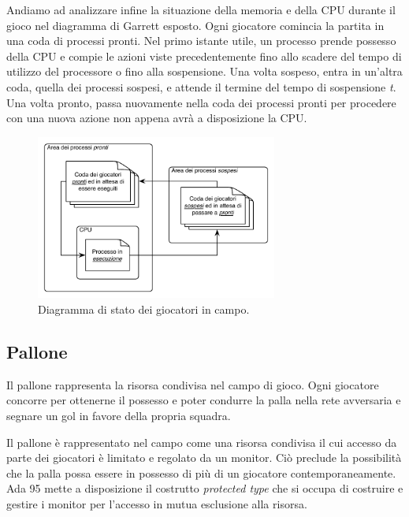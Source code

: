 \documentclass[aps,letterpaper,10pt]{article}
\begin{document}
Andiamo ad analizzare infine la situazione della memoria e della CPU durante il gioco nel diagramma di Garrett esposto.
Ogni giocatore comincia la partita in una coda di processi pronti. Nel primo istante utile, un processo prende possesso
della CPU e compie le azioni viste precedentemente fino allo scadere del tempo di utilizzo del processore o fino alla
sospensione. Una volta sospeso, entra in un'altra coda, quella dei processi sospesi, e attende il termine del tempo di
sospensione \emph{t}. Una volta pronto, passa nuovamente nella coda dei processi pronti per procedere con una nuova
azione non appena avr\`a a disposizione la CPU.

\begin{figure}[H]
	\begin{center}
		\includegraphics[width=300px]{images/player-schema.pdf}
	\end{center}
\caption{Diagramma di stato dei giocatori in campo.}
\end{figure}

\subsection{Pallone}
\label{pallone}

Il pallone rappresenta la risorsa condivisa nel campo di gioco. Ogni giocatore concorre per ottenerne il possesso e
poter condurre la palla nella rete avversaria e segnare un gol in favore della propria squadra. \vspace{3mm}

Il pallone \`e rappresentato nel campo come una risorsa condivisa il cui accesso da parte dei giocatori \`e limitato e
regolato da un monitor. Ci\`o preclude la possibilit\`a che la palla possa essere in possesso di pi\`u di un giocatore
contemporaneamente. Ada 95 mette a disposizione il costrutto \emph{protected type} che si occupa di costruire e gestire
i monitor per l'accesso in mutua esclusione alla risorsa. \vspace{3mm}
\end{document}
